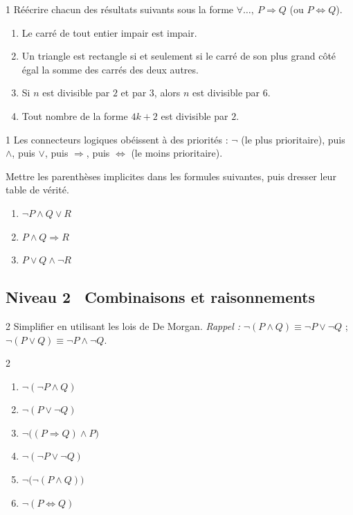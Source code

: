 \begin{exo}{1}
R\'e\'ecrire chacun des r\'esultats suivants sous la forme
$\forall \ldots,\ P \Rightarrow Q$ (ou $P \Leftrightarrow Q$).
\begin{enumerate}
  \item Le carr\'e de tout entier impair est impair.
  \item Un triangle est rectangle si et seulement si le carr\'e de son
        plus grand c\^ot\'e \'egal la somme des carr\'es des deux autres.
  \item Si $n$ est divisible par $2$ et par $3$, alors $n$ est divisible par $6$.
  \item Tout nombre de la forme $4k+2$ est divisible par $2$.
\end{enumerate}
\end{exo}

\begin{exo}{1}
Les connecteurs logiques ob\'eissent \`a des priorit\'es :
$\lnot$ (le plus prioritaire), puis $\land$, puis $\lor$, puis $\Rightarrow$,
puis $\Leftrightarrow$ (le moins prioritaire).

Mettre les parenth\`eses implicites dans les formules suivantes,
puis dresser leur table de v\'erit\'e.
\begin{enumerate}
  \item $\lnot P \land Q \lor R$
  \item $P \land Q \Rightarrow R$
  \item $P \lor Q \land \lnot R$
\end{enumerate}
\end{exo}

\subsection*{\quad Niveau 2 \textemdash\ Combinaisons et raisonnements}

\begin{exo}{2}
Simplifier en utilisant les lois de De Morgan.
\emph{Rappel :} $\lnot(P \land Q) \equiv \lnot P \lor \lnot Q$ ;
$\lnot(P \lor Q) \equiv \lnot P \land \lnot Q$.
\begin{multicols}{2}
\begin{enumerate}
  \item $\lnot(\lnot P \land Q)$
  \item $\lnot(P \lor \lnot Q)$
  \item $\lnot\bigl((P \Rightarrow Q) \land P\bigr)$
  \item $\lnot(\lnot P \lor \lnot Q)$
  \item $\lnot\bigl(\lnot(P \land Q)\bigr)$
  \item $\lnot(P \Leftrightarrow Q)$
\end{enumerate}
\end{multicols}
\end{exo}

